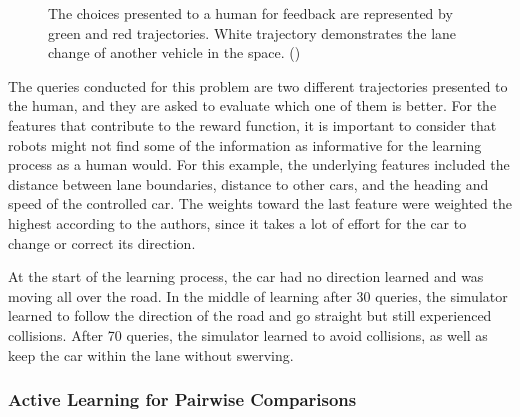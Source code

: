 \documentclass[
  letterpaper,
  numbers=noenddot,
  DIV=11]{scrreprt}
\theoremstyle{definition}
\theoremstyle{plain}
\theoremstyle{plain}
\theoremstyle{remark}
\begin{document}
\begin{figure}


\caption{\label{fig-car_direct}The choices presented to a human for
feedback are represented by green and red trajectories. White trajectory
demonstrates the lane change of another vehicle in the space.
()}

\end{figure}%

The queries conducted for this problem are two different trajectories
presented to the human, and they are asked to evaluate which one of them
is better. For the features that contribute to the reward function, it
is important to consider that robots might not find some of the
information as informative for the learning process as a human would.
For this example, the underlying features included the distance between
lane boundaries, distance to other cars, and the heading and speed of
the controlled car. The weights toward the last feature were weighted
the highest according to the authors, since it takes a lot of effort for
the car to change or correct its direction.

At the start of the learning process, the car had no direction learned
and was moving all over the road. In the middle of learning after 30
queries, the simulator learned to follow the direction of the road and
go straight but still experienced collisions. After 70 queries, the
simulator learned to avoid collisions, as well as keep the car within
the lane without swerving.

\subsubsection*{Active Learning for Pairwise
Comparisons}\label{active-learning-for-pairwise-comparisons}
\end{document}
